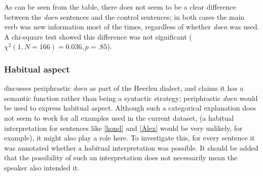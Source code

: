 \documentclass[12pt]{article}
\begin{document}
\begin{table}[h] \footnotesize

\caption{\footnotesize Distribution of whether the main verb contained new information for the \emph{doen} sentences and the control sentences.}
\end{table}

As can be seen from the table, there does not seem to be a clear difference between the \emph{doen} sentences and the control sentences; in both cases the main verb was new information most of the times, regardless of whether \emph{doen} was used. A chi-square test showed this difference was not significant ($\chi^2(1, N=166) = 0.036, p = .85$).

\subsubsection{Habitual aspect}

\citet{c94} discusses periphrastic \emph{doen} as part of the Heerlen dialect, and claims it has a semantic function rather than being a syntactic strategy; periphrastic \emph{doen} would be used to express habitual aspect. Although such a categorical explanation does not seem to work for all examples used in the current dataset, (a habitual interpretation for sentences like \ref{hond} and \ref{Alex} would be very unlikely, for example), it might also play a role here. To investigate this, for every sentence it was annotated whether a habitual interpretation was possible. It should be added that the possibility of such an interpretation does not necessarily mean the speaker also intended it.

\begin{table}[h] \footnotesize

\caption{\footnotesize Distribution of whether habitual interpration is possible for the \emph{doen} sentences and the control sentences.}
\end{table}
\end{document}
